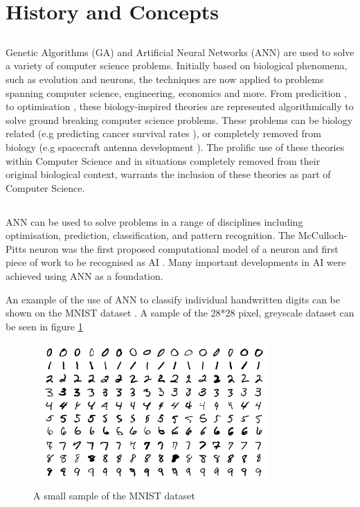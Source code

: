 \documentclass[a4paper]{report}
\begin{document}
\maketitle

\section{History and Concepts}
\subsection{}
Genetic Algorithms (GA) and Artificial Neural Networks (ANN) are used to solve a variety of computer science problems. Initially based on biological phenomena, such as evolution and neurons, the techniques are now applied to problems spanning computer science, engineering, economics and more. From predicition \cite{CancerGene}, to optimisation \cite{wiggleAntenna}, these biology-inspired theories are represented algorithmically to solve ground breaking computer science problems. These problems can be biology related (e.g predicting cancer survival rates \cite{CancerGene}), or completely removed from biology (e.g spacecraft antenna development \cite{wiggleAntenna}). The prolific use of these theories within Computer Science and in situations completely removed from their original biological context, warrants the inclusion of these theories as part of Computer Science.

\subsection{}
ANN can be used to solve problems in a range of disciplines including optimisation, prediction, classification, and pattern recognition.
The McCulloch-Pitts neuron was the first proposed computational model of a neuron and first piece of work to be recognised as AI \cite{RussNor}. Many important developments in AI were achieved using ANN as a foundation.

An example of the use of ANN to classify individual handwritten digits can be shown on the MNIST dataset \cite{mnist}. A sample of the 28*28 pixel, greyscale dataset can be seen in figure \ref{fig:mnistSample}

\begin{figure}[H]
    \centering
    \includegraphics[width=0.8\textwidth]{images/MnistExamples.png}
    \caption{A small sample of the MNIST dataset}
    \label{fig:mnistSample}
\end{figure}
\end{document}
